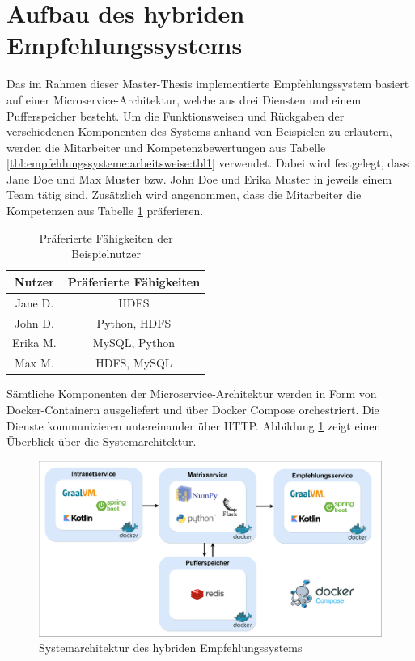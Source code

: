 \section{Aufbau des hybriden Empfehlungssystems}
\label{ch:methodik:versuchsaufbau:systemarchitektur}
Das im Rahmen dieser Master-Thesis implementierte Empfehlungssystem basiert auf einer Microservice-Architektur, welche aus drei Diensten und einem Pufferspeicher besteht. Um die Funktionsweisen und Rückgaben der verschiedenen Komponenten des Systems anhand von Beispielen zu erläutern, werden die Mitarbeiter und Kompetenzbewertungen aus Tabelle \ref{tbl:empfehlungssysteme:arbeitsweise:tbl1} verwendet. Dabei wird festgelegt, dass Jane Doe und Max Muster bzw. John Doe und Erika Muster in jeweils einem Team tätig sind. Zusätzlich wird angenommen, dass die Mitarbeiter die Kompetenzen aus Tabelle \ref{tbl:methodik:versuchsaufbau:systemarchitektur:tbl1} präferieren.

\begin{table}[h]
	\centering
	\begin{tabular}{c|c}
		\textbf{Nutzer} & \textbf{Präferierte Fähigkeiten}\\
		\hline
		Jane D.     & HDFS\\
		John D.     & Python, HDFS\\
		Erika M.    & MySQL, Python\\
		Max M.      & HDFS, MySQL
	\end{tabular}
	\caption{Präferierte Fähigkeiten der Beispielnutzer}
	\label{tbl:methodik:versuchsaufbau:systemarchitektur:tbl1}
\end{table}

Sämtliche Komponenten der Microservice-Architektur werden in Form von Docker-Containern ausgeliefert und über Docker Compose orchestriert. Die Dienste kommunizieren untereinander über HTTP. Abbildung \ref{fig:methodik:systemarchitekturn:abb1} zeigt einen Überblick über die Systemarchitektur.

\begin{figure}[h]
	\centering
	\includegraphics[width=1\textwidth]{gfx/ArchitekturMitLinie.jpg}
	\caption{Systemarchitektur des hybriden Empfehlungssystems}
	\label{fig:methodik:systemarchitekturn:abb1}
\end{figure}


